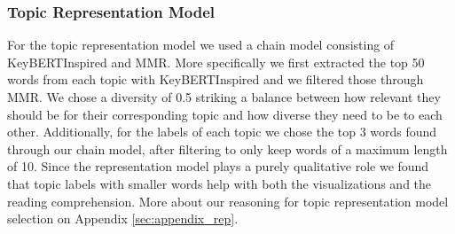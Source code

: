 \subsubsection{Topic Representation Model}
\label{sec:topicrep}
For the topic representation model we used a chain model consisting of KeyBERTInspired and MMR. More specifically we first extracted the top 50 words from each topic with KeyBERTInspired and we filtered those through MMR. We chose a diversity of 0.5 striking a balance between how relevant they should be for their corresponding topic and how diverse they need to be to each other. Additionally, for the labels of each topic we chose the top 3 words found through our chain model, after filtering to only keep words of a maximum length of 10. Since the representation model plays a purely qualitative role we found that topic labels with smaller words help with both the visualizations and the reading comprehension. More about our reasoning for topic representation model selection on Appendix \ref{sec:appendix_rep}.